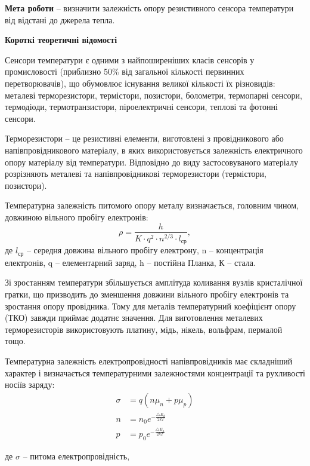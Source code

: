 \documentclass[a4paper,14pt]{extreport}
\begin{document}
\newpage
\setcounter{page}{2}
\textbf{Мета роботи} – визначити залежність опору резистивного сенсора
температури від відстані до джерела тепла.



\begin{center}
  \textbf{Короткі теоретичні відомості}
\end{center} 
  Сенсори температури є одними з найпоширеніших класів сенсорів у
  промисловості (приблизно 50\% від загальної кількості первинних
  перетворювачів), що обумовлює існування великої кількості їх різновидів:
  металеві терморезистори, термістори, позистори, болометри, термопарні сенсори,
  термодіоди, термотранзистори, піроелектричні сенсори, теплові та фотонні
  сенсори.\par
  Терморезистори – це резистивні елементи, виготовлені з провідникового або
  напівпровідникового матеріалу, в яких використовується залежність електричного
  опору матеріалу від температури. Відповідно до виду застосовуваного матеріалу
  розрізняють металеві та напівпровідникові терморезистори (термістори,
  позистори).\par
  Температурна залежність питомого опору металу визначається, головним
  чином, довжиною вільного пробігу електронів:
  \begin{equation}
  \rho=\dfrac{h}{K\cdot q^2\cdot n^{2/3}\cdot l_{\text{ср}}},
  \end{equation}
  де $l_{\text{ср}}$ – середня довжина вільного пробігу електрону, n – концентрація електронів,
  q – елементарний заряд, h – постійна Планка, К – стала.\par
  Зі зростанням температури збільшується амплітуда коливання вузлів
  кристалічної гратки, що призводить до зменшення довжини вільного пробігу електронів та зростання опору провідника. Тому для металів температурний коефіцієнт опору (ТКО) завжди приймає додатнє значення. Для виготовлення металевих терморезисторів використовують платину, мідь, нікель, вольфрам, пермалой тощо.\par
  Температурна залежність електропровідності напівпровідників має
  складніший характер і визначається температурними залежностями концентрації та рухливості носіїв заряду:
  \begin{align}
  \sigma &= q(n\mu_n+p\mu_p)\\
  n &= n_0 e^{-\frac{\triangle E_d}{2kT}}\\
  p &= p_0 e^{-\frac{\triangle E_a}{2kT}}
  \end{align}

  де
  $\sigma$ – питома електропровідність,
\end{document}
